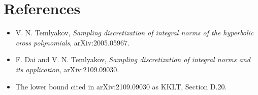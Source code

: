 \documentclass[11pt]{article}
\begin{document}
\section{References}

\begin{itemize}[leftmargin=*]
\item V. N. Temlyakov, \emph{Sampling discretization of integral norms of the
hyperbolic cross polynomials}, arXiv:2005.05967.
\item F. Dai and V. N. Temlyakov, \emph{Sampling discretization of integral
norms and its application}, arXiv:2109.09030.
\item The lower bound cited in arXiv:2109.09030 as KKLT, Section D.20.
\end{itemize}
\end{document}
